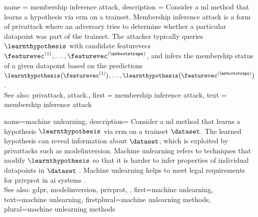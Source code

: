 {name = {membership inference attack}, 
 description = {Consider a \gls{ml} method that learns a \gls{hypothesis} 
                via \gls{erm} on a \gls{trainset}. Membership inference 
                \gls{attack} is a form of \gls{privattack} where an adversary tries 
				to determine whether a particular \gls{datapoint} was part 
				of the \gls{trainset}. The attacker typically queries 
				$\learnthypothesis$ with candidate \glspl{featurevec} 
				$\featurevec^{(1)},\ldots,\featurevec^{(\nrbootstraps)}$, 
				and infers the membership status of a given \gls{datapoint} 
				based on the \glspl{prediction} $\learnthypothesis\big(\featurevec^{(1)}\big),\ldots,
				\learnthypothesis\big(\featurevec^{(\nrbootstraps)}\big)$ \cite{Shokri2017}.\\ 
				See also: \gls{privattack}, \gls{attack}.}, 
 first = {membership inference attack}, 
 text = {membership inference attack}
}

{name={machine unlearning},
 description={
	Consider a \gls{ml} method that learns a \gls{hypothesis} $\learnthypothesis$ 
	via \gls{erm} on a \gls{trainset} $\dataset$. The learned \gls{hypothesis} can 
	reveal information about $\dataset$, which is exploited by \glspl{privattack} such as 
	\gls{modelinversion}. Machine unlearning refers to techniques that 
	modify $\learnthypothesis$ so that it is harder to infer properties of individual 
	\glspl{datapoint} in $\dataset$ \cite{cao2015unlearning}. Machine unlearning helps 
	to meet legal requirements for \gls{privprot} in \gls{ai} systems \cite{GDPR2016}. \\[4pt]
	 See also: \gls{gdpr}, \gls{modelinversion}, \gls{privprot}, },
	first={machine unlearning},
	text={machine unlearning},
	firstplural={machine unlearning methods},
	plural={machine unlearning methods}
}

